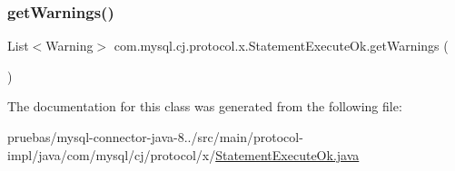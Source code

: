\subsubsection{\texorpdfstring{get\+Warnings()}{getWarnings()}}
{\footnotesize\ttfamily List$<$Warning$>$ com.\+mysql.\+cj.\+protocol.\+x.\+Statement\+Execute\+Ok.\+get\+Warnings (\begin{DoxyParamCaption}{ }\end{DoxyParamCaption})}



The documentation for this class was generated from the following file\+:\begin{DoxyCompactItemize}
\item 
pruebas/mysql-\/connector-\/java-\/8../src/main/protocol-\/impl/java/com/mysql/cj/protocol/x/\mbox{\hyperlink{_statement_execute_ok_8java}{Statement\+Execute\+Ok.\+java}}\end{DoxyCompactItemize}
